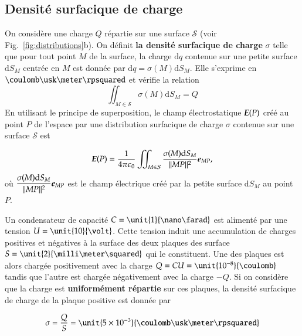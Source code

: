 \subsection{Densité surfacique de charge}
	On considère une charge $Q$ répartie sur une surface $\mathcal{S}$
	(voir Fig.~\ref{fig:distributions}b). 
	On définit \textbf{
	la densité surfacique de charge} $\sigma$ 
	telle que pour tout point $M$ de la surface,
	la charge $\mathrm{d}q$ contenue sur une petite surface $\mathrm{d}S_M$ centrée 
	en $M$ est donnée par $\mathrm{d}q = \sigma(M) \mathrm{d}S_M$.
	Elle s'exprime en $\coulomb \usk  \meter \rpsquared$ et vérifie la relation
\begin{equation*}
	\iint_{M \in \mathcal{S}} \sigma(M) \mathrm{d}S_M = Q
\end{equation*}
En utilisant le principe de superposition, le champ électrostatique $\vece(P)$
créé au point $P$ de l'espace par une distribution surfacique de charge $\sigma$
contenue sur une surface $\mathcal{S}$ est

\begin{equation}
	\vece(P) = \pieps \iint_{M \in \mathcal{S}} 
	\dfrac{\sigma(M) \mathrm{d}S_M}{||MP||^2}\mitbf{e}_{MP},
\end{equation}
où $\dfrac{\sigma(M) \mathrm{d}S_M}{||MP||^2}\mitbf{e}_{MP}$ est le champ 
électrique créé par la petite surface $\mathrm{d}S_M$ au point $P$.

\begin{exemple}
	Un condensateur de capacité $C = \unit{1}{\nano \farad}$ est alimenté 
	par une tension $U = \unit{10}{\volt}$. Cette tension induit une 
	accumulation de charges positives et négatives à la surface des deux 
	plaques des surface $S = \unit{2}{\milli \meter \squared}$
	qui le constituent. Une des plaques est alors chargée positivement
	avec la charge $Q = CU = \unit{10^{-8}}{\coulomb}$ 
	tandis que l'autre est chargée négativement avec la 
	charge $-Q$. Si on considère que la charge est \textbf{uniformément répartie}
	sur ces plaques, la densité surfacique de charge de la plaque positive
	est donnée par

	\begin{equation*}
		\sigma = \dfrac{Q}{S} = \unit{5 \times 10^{-3}}
		                        {\coulomb \usk \meter \rpsquared}
	\end{equation*}
\end{exemple}
